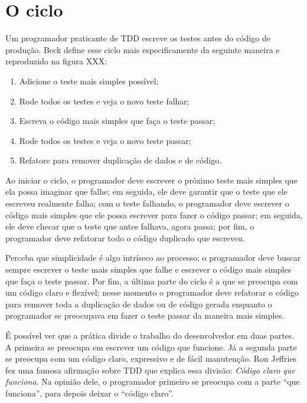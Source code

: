 \section{O ciclo}

Um programador praticante de TDD escreve os testes antes do código de produção.
Beck define esse ciclo mais especificamente da seguinte maneira
\cite{TDDByExample} e reproduzido na figura XXX:

\begin{enumerate}
	\item Adicione o teste mais simples possível; 
	\item Rode todos os testes e veja o novo teste falhar; 
	\item Escreva o código mais simples que faça o teste passar; 
	\item Rode todos os testes e veja o novo teste passar; 
	\item Refatore para remover duplicação de dados e de código.
\end{enumerate}

Ao iniciar o ciclo, o programador deve escrever o próximo teste mais simples que
ela possa imaginar que falhe; em seguida, ele deve garantir que o teste que ele
escreveu realmente falha; com o teste falhando, o programador deve escrever o
código mais simples que ele possa escrever para fazer o código passar; em
seguida, ele deve checar que o teste que antes falhava, agora passa; por fim, o
programador deve refatorar todo o código duplicado que escreveu.

Perceba que simplicidade é algo intríseco ao processo; o programador deve buscar
sempre escrever o teste mais simples que falhe e escrever o código mais simples
que faça o teste passar. Por fim, a última parte do ciclo é a que se preocupa
com um código claro e flexível; nesse momento o programador deve refatorar o
código para remover toda a duplicação de dados ou de código gerada enquanto o
programador se preocupava em fazer o teste passar da maneira mais simples.

É possível ver que a prática divide o trabalho do desenvolvedor em duas partes.
A primeira se preocupa em escrever um código que funcione. Já a segunda parte
se preocupa com um código claro, expressivo e de fácil manutenção. Ron Jeffries
fez uma famosa afirmação sobre TDD que explica essa divisão: \textit{Código
claro que funciona}. Na opinião dele, o programador primeiro se preocupa com a
parte ``que funciona'', para depois deixar o ``código claro''.

